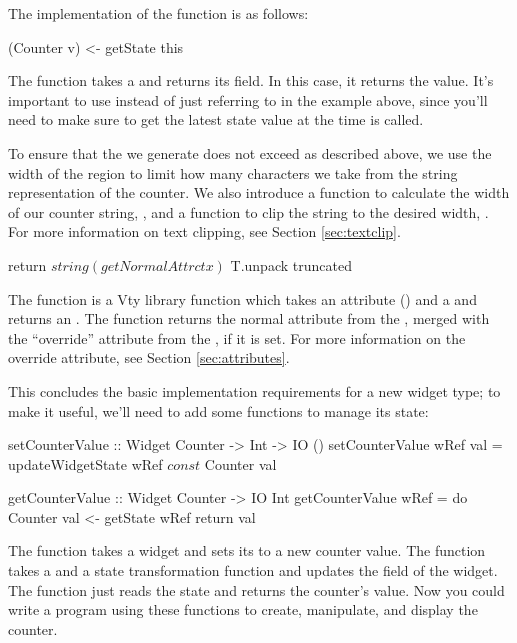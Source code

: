 The implementation of the  function is as follows:

\begin{haskellcode}
 (Counter v) <- getState this
\end{haskellcode}

The  function takes a  and returns its
 field.  In this case, it returns the  value.
It's important to use  instead of just referring to
 in the example above, since you'll need to make sure to get
the latest state value at the time  is called.


To ensure that the  we generate does not exceed  as
described above, we use the width of the region to limit how many
characters we take from the string representation of the counter.  We
also introduce a function to calculate the width of our counter
string, , and a function to clip the string to the
desired width, .  For more information on text clipping,
see Section \ref{sec:textclip}.

\begin{haskellcode}
 return $ string (getNormalAttr ctx) $ T.unpack truncated
\end{haskellcode}

The  function is a Vty library function which takes an
attribute () and a  and returns an .
The  function returns the normal attribute from the
, merged with the ``override'' attribute from the
, if it is set.  For more information on the
override attribute, see Section \ref{sec:attributes}.

This concludes the basic implementation requirements for a new widget
type; to make it useful, we'll need to add some functions to manage
its state:

\begin{haskellcode}
 setCounterValue :: Widget Counter -> Int -> IO ()
 setCounterValue wRef val =
    updateWidgetState wRef $ const $ Counter val

 getCounterValue :: Widget Counter -> IO Int
 getCounterValue wRef = do
    Counter val <- getState wRef
    return val
\end{haskellcode}

The  function takes a  widget and sets
its  to a new counter value.  The 
function takes a  and a state transformation function and
updates the  field of the widget.  The 
function just reads the state and returns the counter's value.  Now
you could write a program using these functions to create, manipulate,
and display the counter.
